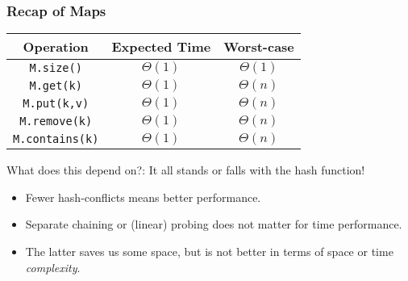\begin{frame}
	\frametitle{Recap of Maps}
	
	\begin{center}
		\begin{tabular}{c | c | c}
			Operation & Expected Time & Worst-case \\
			\midrule
			\texttt{M.size()} & $\Theta(1)$& $\Theta(1)$\\
			\texttt{M.get(k)}  & $\Theta(1)$& $\Theta(n)$\\
			\texttt{M.put(k,v)} & $\Theta(1)$& $\Theta(n)$\\
			\texttt{M.remove(k)} & $\Theta(1)$& $\Theta(n)$\\
			\texttt{M.contains(k)} & $\Theta(1)$& $\Theta(n)$\\
		\end{tabular}
	\end{center}
	
What does this depend on?:	It all stands or falls with the hash function!
			\begin{itemize}
				\item Fewer hash-conflicts means better performance.
				\item Separate chaining or (linear) probing does not matter for time performance.
				\item The latter saves us some space, but is not better in terms of space or time \textit{complexity}.
			\end{itemize}
\end{frame}

